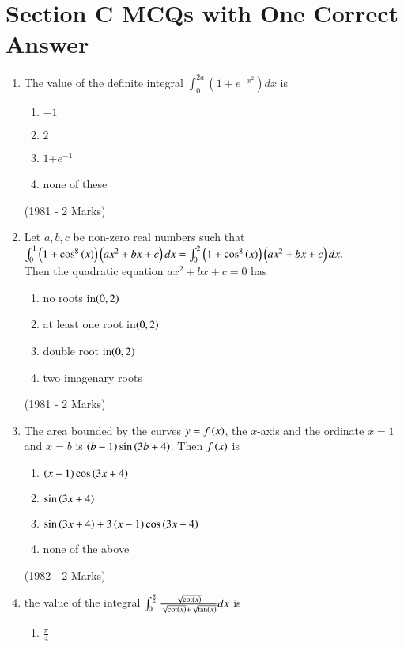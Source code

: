 \documentclass[journal,12pt,twocolumn]{IEEEtran}
\theoremstyle{remark}
\begin{document}
\section{Section C MCQs with One Correct Answer}
\begin{enumerate}
	\item The value of the definite integral $\int_0^{2a}(1+e^{-x^2})dx$ is\\
		\begin{enumerate}
                	\item $-1$            
	                \item  $2$
	                \item  $1$+$e^{-1}$    
	\item  none of these
		\end{enumerate}
		\hfill{(1981 - 2 Marks)}
	\item Let $a,b,c$ be non-zero real numbers such that $\int_0^1 \left(1+ \cos ^8 \left(x\right)\right) \left(ax^2 + bx +c\right) dx = \int_0^2 \left( 1+ \cos^8\left(x\right) \right) \left(ax^2+bx+c\right) dx.$\\
		Then the quadratic equation $ax^2+bx+c=0$ has
			\begin{enumerate}
			\item no roots in$ \left(0,2\right)$
			\item at least one root in$ \left(0,2\right)$
			\item double root in$ \left(0,2\right)  $
	\item two imagenary roots
                        \end{enumerate}
		\hfill{(1981 - 2 Marks)}
	\item The area bounded by the curves $y=f\left(x\right)$, the $x$-axis and the ordinate $x=1$ and $x=b$ is $\left(b-1\right) \sin \left(3b+4\right)$. Then $f\left(x\right)$ is 
	                \begin{enumerate}
			\item$\left(x-1\right) \cos \left(3x+4\right)$
			\item$\sin {\ensuremath{\left(3x+4\right)}}$
			\item$\sin {\ensuremath{\left(3x+4\right)}+3\ensuremath{\left(x-1\right)} \cos {\ensuremath{\left(3x+4\right)}}}$
			\item none of the above
		        \end{enumerate}
		\hfill{(1982 - 2 Marks)}
	\item the value of the integral $\int_0^{\frac{\pi}{2}} \frac{\sqrt{\cot\left(x\right)}}{\sqrt{\cot\left(x\right)}+\sqrt{\tan\left(x\right)}}dx$ is 
	                \begin{enumerate}
			\item $\frac{\pi}{4}$

\end{enumerate}
\end{enumerate}
\end{document}
